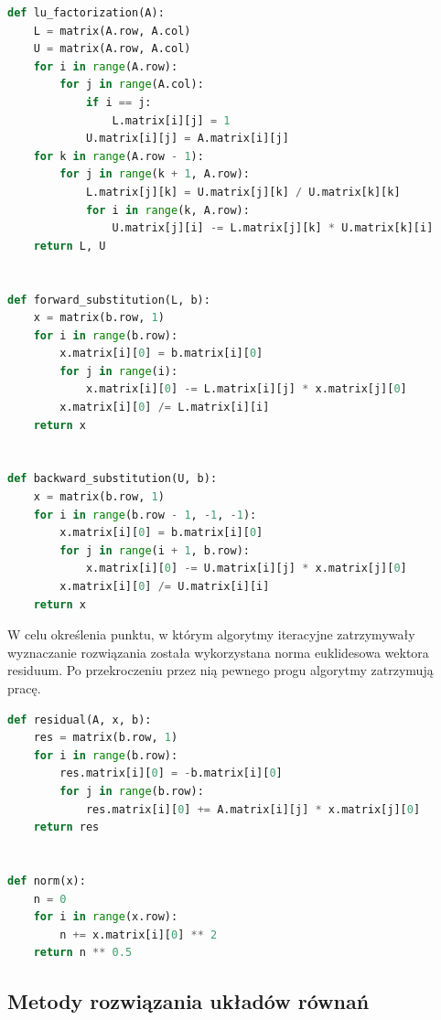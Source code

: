 \documentclass{article}
\begin{document}
\vspace{0.75em}
\begin{lstlisting}[language=Python, caption=Implementacja metod podstawienia wprzód/wstecz oraz faktoryzacji]
def lu_factorization(A):
    L = matrix(A.row, A.col)
    U = matrix(A.row, A.col)
    for i in range(A.row):
        for j in range(A.col):
            if i == j:
                L.matrix[i][j] = 1
            U.matrix[i][j] = A.matrix[i][j]
    for k in range(A.row - 1):
        for j in range(k + 1, A.row):
            L.matrix[j][k] = U.matrix[j][k] / U.matrix[k][k]
            for i in range(k, A.row):
                U.matrix[j][i] -= L.matrix[j][k] * U.matrix[k][i]
    return L, U


def forward_substitution(L, b):
    x = matrix(b.row, 1)
    for i in range(b.row):
        x.matrix[i][0] = b.matrix[i][0]
        for j in range(i):
            x.matrix[i][0] -= L.matrix[i][j] * x.matrix[j][0]
        x.matrix[i][0] /= L.matrix[i][i]
    return x


def backward_substitution(U, b):
    x = matrix(b.row, 1)
    for i in range(b.row - 1, -1, -1):
        x.matrix[i][0] = b.matrix[i][0]
        for j in range(i + 1, b.row):
            x.matrix[i][0] -= U.matrix[i][j] * x.matrix[j][0]
        x.matrix[i][0] /= U.matrix[i][i]
    return x
\end{lstlisting}
\vspace{1.5em}

W celu określenia punktu, w którym algorytmy iteracyjne zatrzymywały wyznaczanie rozwiązania została wykorzystana norma euklidesowa wektora residuum. Po przekroczeniu przez nią pewnego progu algorytmy zatrzymują pracę.

\vspace{0.75em}
\begin{lstlisting}[language=Python, caption=Definicja metod wyznaczania normy i residuum]
def residual(A, x, b):
    res = matrix(b.row, 1)
    for i in range(b.row):
        res.matrix[i][0] = -b.matrix[i][0]
        for j in range(b.row):
            res.matrix[i][0] += A.matrix[i][j] * x.matrix[j][0]
    return res


def norm(x):
    n = 0
    for i in range(x.row):
        n += x.matrix[i][0] ** 2
    return n ** 0.5
\end{lstlisting}

\newpage

\subsection{Metody rozwiązania układów równań}
\end{document}
